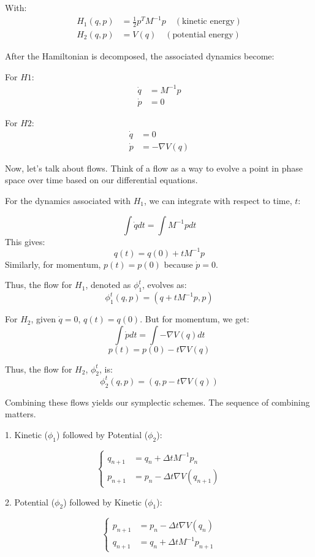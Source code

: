 \documentclass{report}
\begin{document}
With:
\begin{align*}
	H_1(q,p) & = \frac{1}{2} p^T M^{-1} p \quad (\text{kinetic energy}) \\
	H_2(q,p) & = V(q) \quad (\text{potential energy})
\end{align*}

After the Hamiltonian is decomposed, the associated dynamics become:

For \(H1\):
\begin{align*}
	\dot{q} &= M^{-1}p \\
	\dot{p} &= 0
\end{align*}

For \(H2\):
\begin{align*}
	\dot{q} &= 0 \\
	\dot{p} &= -\nabla V(q)
\end{align*}

Now, let's talk about flows. Think of a flow as a way to evolve a point in phase space over time based on our differential equations.

For the dynamics associated with \(H_1\), we can integrate with respect to time, \( t \):

\[ \int \dot{q} dt = \int M^{-1}p dt \]
This gives:
\[ q(t) = q(0) + tM^{-1}p \]
Similarly, for momentum, \( p(t) = p(0) \) because \(\dot{p}=0\). 

Thus, the flow for \(H_1\), denoted as \(\phi_1^t\), evolves as:
\[ \phi_1^t(q, p) = (q + tM^{-1}p, p) \]

For \(H_2\), given \(\dot{q} = 0\), \( q(t) = q(0) \). But for momentum, we get:
\[ \int \dot{p} dt = \int -\nabla V(q) dt \]
\[ p(t) = p(0) - t\nabla V(q) \]

Thus, the flow for \(H_2\), \(\phi_2^t\), is:
\[ \phi_2^t(q, p) = (q, p - t\nabla V(q)) \]

Combining these flows yields our symplectic schemes. The sequence of combining matters.

1. Kinetic (\(\phi_1\)) followed by Potential (\(\phi_2\)):

\[
	\begin{cases}
		q_{n+1} &= q_n + \Delta t M^{-1} p_n \\
		p_{n+1} &= p_n - \Delta t \nabla V(q_{n+1})
	\end{cases}
\]

2. Potential (\(\phi_2\)) followed by Kinetic (\(\phi_1\)):

\[
	\begin{cases}
		p_{n+1} &= p_n - \Delta t \nabla V(q_n) \\
		q_{n+1} &= q_n + \Delta t M^{-1} p_{n+1}
	\end{cases}
\]
\end{document}
